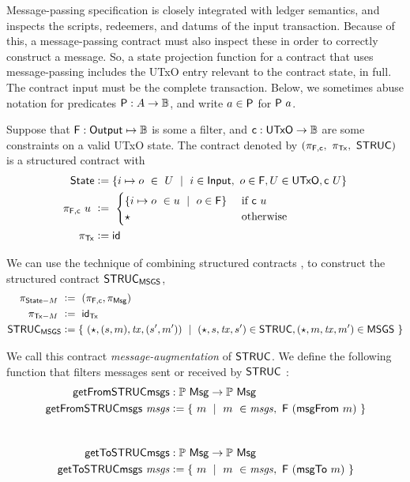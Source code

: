 Message-passing specification is closely integrated with ledger semantics,
and inspects the scripts, redeemers, and datums of the input transaction.
Because of this, a message-passing contract must also inspect these
in order to correctly construct a message. So, a state projection function
for a contract that uses message-passing includes the UTxO entry relevant
to the contract state, in full. The contract input must be the complete transaction.
Below, we sometimes abuse notation for predicates $\mathsf{P} : A \to \mathbb{B}$,
and write $a \in \mathsf{P}$ for $\mathsf{P}~a$.

Suppose that $\mathsf{F} : \mathsf{Output} \mapsto \mathbb{B}$ is some a filter, and
$\mathsf{c} : \mathsf{UTxO} \to \mathbb{B}$ are some constraints on a valid UTxO state. The contract
denoted by $(\pi_{\mathsf{F,c}},~\pi_{\mathsf{Tx}},~\mathsf{STRUC})$ is a structured contract with
\begin{align*}
  \mathsf{State} &\mathrel{\mathop:}= \{ i \mapsto o~\in~U ~\mid~i \in \textsf{Input},~o \in \mathsf{F}, U \in \mathsf{UTxO}, \mathsf{c}~U \} \\
  \pi_{\mathsf{F,c}}~ u~&\mathrel{\mathop:}= ~\begin{cases}
    \{ i \mapsto o ~\in u~\mid ~o \in \mathsf{F} \} & \text{ if } \mathsf{c}~u \\
    \star  & \text{ otherwise }
  \end{cases}~\\
  \pi_{\mathsf{Tx}} &\mathrel{\mathop:}= \mathsf{id}
\end{align*}

We can use the technique of
combining structured contracts \cite{structured}, to construct
the structured contract $\mathsf{STRUC}_{\mathsf{MSGS}}$,
\begin{align*}
  \pi_{\mathsf{State}-M}~&\mathrel{\mathop:}=~(\pi_{\mathsf{F,c}}, \pi_{\mathsf{Msg}}) \\
  \pi_{\mathsf{Tx}-M}~&\mathrel{\mathop:}=~\mathsf{id}_{\mathsf{Tx}} \\
  \mathsf{STRUC}_{\mathsf{MSGS}} &\mathrel{\mathop:}= \{~ (\star, (s, m), \mathit{tx}, (s', m'))~\mid~
  (\star, s, \mathit{tx}, s') \in \mathsf{STRUC}, (\star, m, \mathit{tx}, m') \in \mathsf{MSGS}~\}
\end{align*}

We call this contract \emph{message-augmentation} of $\mathsf{STRUC}$.
We define the following function that filters messages sent or received by $\mathsf{STRUC}$ :
\begin{align*}
  \fun{getFromSTRUCmsgs} &: \powerset{\Msg} \to \powerset{\Msg}  \\
  \fun{getFromSTRUCmsgs} ~\var{msgs} & \leteq \{~m~\mid~m~\in \var{msgs},~\fun{F}~(\fun{msgFrom}~m)~\} \\
  \nextdef
  \fun{getToSTRUCmsgs} &: \powerset{\Msg}   \to \powerset{\Msg} \\
  \fun{getToSTRUCmsgs} ~\var{msgs} & \leteq \{~m~\mid~m~\in \var{msgs},~\fun{F}~(\fun{msgTo}~m)~\} \\
\end{align*}

